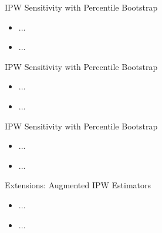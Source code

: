 \documentclass{beamer}
\begin{document}

\begin{frame}{IPW Sensitivity with Percentile Bootstrap}

\begin{itemize}
  \itemsep12pt
  \item ...
  \item ...
\end{itemize}

\end{frame}


\begin{frame}{IPW Sensitivity with Percentile Bootstrap}

\begin{itemize}
  \itemsep12pt
  \item ...
  \item ...
\end{itemize}

\end{frame}


\begin{frame}{IPW Sensitivity with Percentile Bootstrap}

\begin{itemize}
  \itemsep12pt
  \item ...
  \item ...
\end{itemize}

\end{frame}


\begin{frame}{Extensions: Augmented IPW Estimators}

\begin{itemize}
  \itemsep12pt
  \item ...
  \item ...
\end{itemize}

\end{frame}

\end{document}
